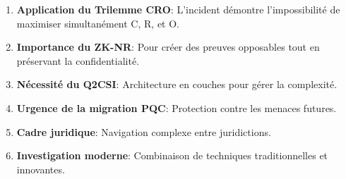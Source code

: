 \begin{enumerate}
\item \textbf{Application du Trilemme CRO}: L'incident démontre l'impossibilité de maximiser simultanément C, R, et O.
\item \textbf{Importance du ZK-NR}: Pour créer des preuves opposables tout en préservant la confidentialité.
\item \textbf{Nécessité du Q2CSI}: Architecture en couches pour gérer la complexité.
\item \textbf{Urgence de la migration PQC}: Protection contre les menaces futures.
\item \textbf{Cadre juridique}: Navigation complexe entre juridictions.
\item \textbf{Investigation moderne}: Combinaison de techniques traditionnelles et innovantes.
\end{enumerate}